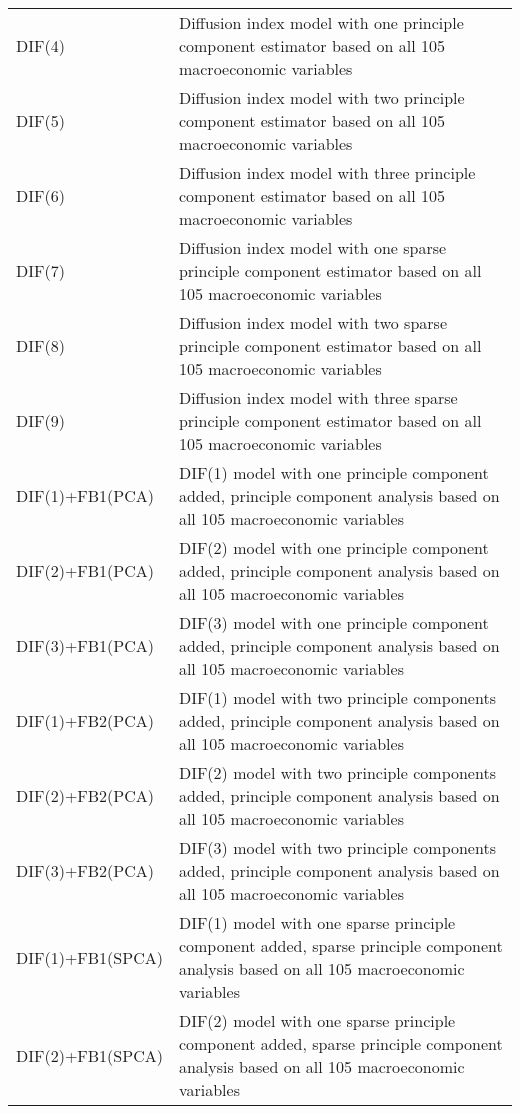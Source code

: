 \begin{footnotesize}
\begin{tabularx}{\linewidth}{lX}
DIF(4)                    & Diffusion index model with one principle component estimator based on all 105 macroeconomic variables \\
DIF(5)                    & Diffusion index model with two principle component estimator based on all 105 macroeconomic variables \\
DIF(6)                    & Diffusion index model with three principle component estimator based on all 105 macroeconomic variables \\
DIF(7)                    & Diffusion index model with one sparse principle component estimator based on all 105 macroeconomic variables \\
DIF(8)                    & Diffusion index model with two sparse principle component estimator based on all 105 macroeconomic variables \\
DIF(9)                    & Diffusion index model with three sparse principle component estimator based on all 105 macroeconomic variables \\
DIF(1)+FB1(PCA)           & DIF(1) model with one principle component added, principle component analysis based on all 105 macroeconomic variables \\
DIF(2)+FB1(PCA)           & DIF(2) model with one principle component added, principle component analysis based on all 105 macroeconomic variables \\
DIF(3)+FB1(PCA)           & DIF(3) model with one principle component added, principle component analysis based on all 105 macroeconomic variables \\
DIF(1)+FB2(PCA)           & DIF(1) model with two principle components added, principle component analysis based on all 105 macroeconomic variables \\
DIF(2)+FB2(PCA)           & DIF(2) model with two principle components added, principle component analysis based on all 105 macroeconomic variables \\
DIF(3)+FB2(PCA)           & DIF(3) model with two principle components added, principle component analysis based on all 105 macroeconomic variables \\
DIF(1)+FB1(SPCA)          & DIF(1) model with one sparse principle component added, sparse principle component analysis based on all 105 macroeconomic variables \\
DIF(2)+FB1(SPCA)          & DIF(2) model with one sparse principle component added, sparse principle component analysis based on all 105 macroeconomic variables \\

\end{tabularx}
\end{footnotesize}
